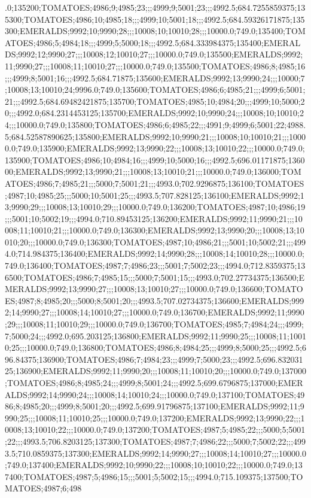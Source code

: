 .0;135200;TOMATOES;4986;9;4985;23;;;4999;9;5001;23;;;4992.5;684.7255859375;135300;TOMATOES;4986;10;4985;18;;;4999;10;5001;18;;;4992.5;684.59326171875;135300;EMERALDS;9992;10;9990;28;;;10008;10;10010;28;;;10000.0;749.0;135400;TOMATOES;4986;5;4984;18;;;4999;5;5000;18;;;4992.5;684.333984375;135400;EMERALDS;9992;12;9990;27;;;10008;12;10010;27;;;10000.0;749.0;135500;EMERALDS;9992;11;9990;27;;;10008;11;10010;27;;;10000.0;749.0;135500;TOMATOES;4986;8;4985;16;;;4999;8;5001;16;;;4992.5;684.71875;135600;EMERALDS;9992;13;9990;24;;;10000;7;10008;13;10010;24;9996.0;749.0;135600;TOMATOES;4986;6;4985;21;;;4999;6;5001;21;;;4992.5;684.69482421875;135700;TOMATOES;4985;10;4984;20;;;4999;10;5000;20;;;4992.0;684.2314453125;135700;EMERALDS;9992;10;9990;24;;;10008;10;10010;24;;;10000.0;749.0;135800;TOMATOES;4986;6;4985;22;;;4991;9;4999;6;5001;22;4988.5;684.52587890625;135800;EMERALDS;9992;10;9990;21;;;10008;10;10010;21;;;10000.0;749.0;135900;EMERALDS;9992;13;9990;22;;;10008;13;10010;22;;;10000.0;749.0;135900;TOMATOES;4986;10;4984;16;;;4999;10;5000;16;;;4992.5;696.01171875;136000;EMERALDS;9992;13;9990;21;;;10008;13;10010;21;;;10000.0;749.0;136000;TOMATOES;4986;7;4985;21;;;5000;7;5001;21;;;4993.0;702.9296875;136100;TOMATOES;4987;10;4985;25;;;5000;10;5001;25;;;4993.5;707.828125;136100;EMERALDS;9992;13;9990;29;;;10008;13;10010;29;;;10000.0;749.0;136200;TOMATOES;4987;10;4986;19;;;5001;10;5002;19;;;4994.0;710.89453125;136200;EMERALDS;9992;11;9990;21;;;10008;11;10010;21;;;10000.0;749.0;136300;EMERALDS;9992;13;9990;20;;;10008;13;10010;20;;;10000.0;749.0;136300;TOMATOES;4987;10;4986;21;;;5001;10;5002;21;;;4994.0;714.984375;136400;EMERALDS;9992;14;9990;28;;;10008;14;10010;28;;;10000.0;749.0;136400;TOMATOES;4987;7;4986;23;;;5001;7;5002;23;;;4994.0;712.8359375;136500;TOMATOES;4986;7;4985;15;;;5000;7;5001;15;;;4993.0;702.27734375;136500;EMERALDS;9992;13;9990;27;;;10008;13;10010;27;;;10000.0;749.0;136600;TOMATOES;4987;8;4985;20;;;5000;8;5001;20;;;4993.5;707.02734375;136600;EMERALDS;9992;14;9990;27;;;10008;14;10010;27;;;10000.0;749.0;136700;EMERALDS;9992;11;9990;29;;;10008;11;10010;29;;;10000.0;749.0;136700;TOMATOES;4985;7;4984;24;;;4999;7;5000;24;;;4992.0;695.203125;136800;EMERALDS;9992;11;9990;25;;;10008;11;10010;25;;;10000.0;749.0;136800;TOMATOES;4986;8;4984;25;;;4999;8;5000;25;;;4992.5;696.84375;136900;TOMATOES;4986;7;4984;23;;;4999;7;5000;23;;;4992.5;696.83203125;136900;EMERALDS;9992;11;9990;20;;;10008;11;10010;20;;;10000.0;749.0;137000;TOMATOES;4986;8;4985;24;;;4999;8;5001;24;;;4992.5;699.6796875;137000;EMERALDS;9992;14;9990;24;;;10008;14;10010;24;;;10000.0;749.0;137100;TOMATOES;4986;8;4985;20;;;4999;8;5001;20;;;4992.5;699.91796875;137100;EMERALDS;9992;11;9990;25;;;10008;11;10010;25;;;10000.0;749.0;137200;EMERALDS;9992;13;9990;22;;;10008;13;10010;22;;;10000.0;749.0;137200;TOMATOES;4987;5;4985;22;;;5000;5;5001;22;;;4993.5;706.8203125;137300;TOMATOES;4987;7;4986;22;;;5000;7;5002;22;;;4993.5;710.0859375;137300;EMERALDS;9992;14;9990;27;;;10008;14;10010;27;;;10000.0;749.0;137400;EMERALDS;9992;10;9990;22;;;10008;10;10010;22;;;10000.0;749.0;137400;TOMATOES;4987;5;4986;15;;;5001;5;5002;15;;;4994.0;715.109375;137500;TOMATOES;4987;6;498